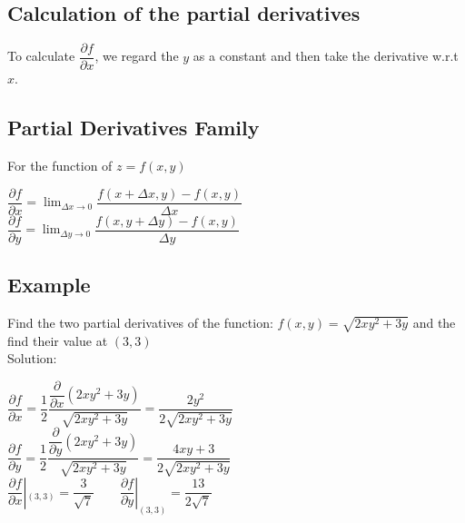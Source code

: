 \documentclass[UTF8,a4paper, 10pt, openany]{book}
\begin{document}
\subsection{Calculation of the partial derivatives}
To calculate $\dfrac{\partial f}{\partial x}$, we regard the $y$ as a constant and then take the derivative w.r.t $x$.
\subsection{Partial Derivatives Family}
For the function of $z=f(x,y)$
\begin{center}
$\dfrac{\partial f}{\partial x}=\displaystyle\lim_{\Delta x \to 0}\dfrac{f(x+\Delta x,y)-f(x,y)}{\Delta x}$\\
$\dfrac{\partial f}{\partial y}=\displaystyle\lim_{\Delta y \to 0}\dfrac{f(x,y+\Delta y)-f(x,y)}{\Delta y}$
\end{center}

\subsection{Example}
Find the two partial derivatives of the function: $f(x,y)=\sqrt{2xy^2+3y}$ and the find their value at $(3,3)$\\
Solution:\\

\begin{center}
$\dfrac{\partial f}{\partial x}=\dfrac{1}{2}\dfrac{\dfrac{\partial}{\partial x}(2xy^2+3y)}{\sqrt{2xy^2+3y}}=\dfrac{2y^2}{2\sqrt{2xy^2+3y}}$\\
$\dfrac{\partial f}{\partial y}=\dfrac{1}{2}\dfrac{\dfrac{\partial}{\partial y}(2xy^2+3y)}{\sqrt{2xy^2+3y}}=\dfrac{4xy+3}{2\sqrt{2xy^2+3y}}$\\
$\displaystyle\dfrac{\partial f}{\partial x}|_{(3,3)}=\dfrac{3}{\sqrt{7}}\qquad \displaystyle\dfrac{\partial f}{\partial y}|_{(3,3)}=\dfrac{13}{2\sqrt{7}}$
\end{center}
\end{document}
